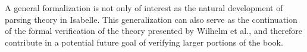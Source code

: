 \begin{isabellebody}
\begin{isamarkuptext}
A general  formalization is not only of interest as the natural development of  parsing
theory in Isabelle. This generalization can also serve as the continuation of the formal verification
of the theory presented by Wilhelm et al., and therefore contribute in a potential future goal of
verifying larger portions of the book.%
\end{isamarkuptext}\isamarkuptrue%
%
\isadelimtheory
%
\endisadelimtheory
%
\isatagtheory
%
\endisatagtheory
{\isafoldtheory}%
%
\isadelimtheory
%
\endisadelimtheory
%
\end{isabellebody}%
\endinput
